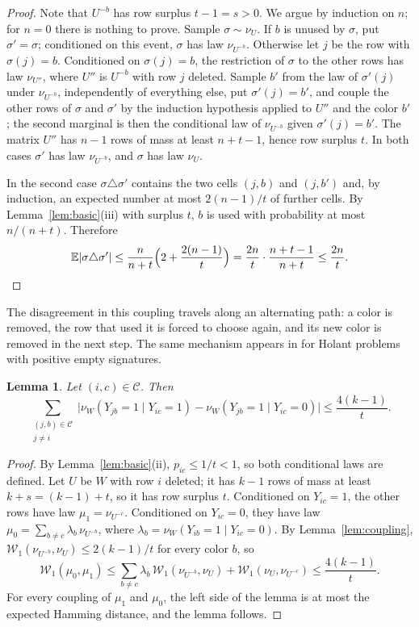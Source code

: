 \documentclass{amsart}
\numberwithin{equation}{section}
\theoremstyle{plain}
\newtheorem{lemma}[theorem]{Lemma}
\theoremstyle{definition}
\theoremstyle{remark}
\newcommand{\E}{\mathbb{E}}
\newcommand{\cC}{\mathcal{C}}
\begin{document}
\begin{proof}
Note that $U^{-b}$ has row surplus $t-1=s>0$. We argue by induction on $n$; for $n=0$ there is nothing to prove. Sample $\sigma\sim\nu_U$. If $b$ is unused by $\sigma$, put $\sigma'=\sigma$; conditioned on this event, $\sigma$ has law $\nu_{U^{-b}}$. Otherwise let $j$ be the row with $\sigma(j)=b$. Conditioned on $\sigma(j)=b$, the restriction of $\sigma$ to the other rows has law $\nu_{U''}$, where $U''$ is $U^{-b}$ with row $j$ deleted. Sample $b'$ from the law of $\sigma'(j)$ under $\nu_{U^{-b}}$, independently of everything else, put $\sigma'(j)=b'$, and couple the other rows of $\sigma$ and $\sigma'$ by the induction hypothesis applied to $U''$ and the color $b'$; the second marginal is then the conditional law of $\nu_{U^{-b}}$ given $\sigma'(j)=b'$. The matrix $U''$ has $n-1$ rows of mass at least $n+t-1$, hence row surplus $t$. In both cases $\sigma'$ has law $\nu_{U^{-b}}$, and $\sigma$ has law $\nu_U$.

In the second case $\sigma\triangle\sigma'$ contains the two cells $(j,b)$ and $(j,b')$ and, by induction, an expected number at most $2(n-1)/t$ of further cells. By Lemma~\ref{lem:basic}(iii) with surplus $t$, $b$ is used with probability at most $n/(n+t)$. Therefore
\[
\E|\sigma\triangle\sigma'|\le\frac{n}{n+t}\Bigl(2+\frac{2(n-1)}{t}\Bigr)=\frac{2n}{t}\cdot\frac{n+t-1}{n+t}\le\frac{2n}{t}.\qedhere
\]
\end{proof}

The disagreement in this coupling travels along an alternating path: a color is removed, the row that used it is forced to choose again, and its new color is removed in the next step. The same mechanism appears in \cite[Algorithm~1 and Proposition~17]{CG} for Holant problems with positive empty signatures.

\begin{lemma}\label{lem:influence}
Let $(i,c)\in\cC$. Then
\[
\sum_{\substack{(j,b)\in\cC\\ j\ne i}}\bigl|\nu_W(Y_{jb}=1\mid Y_{ic}=1)-\nu_W(Y_{jb}=1\mid Y_{ic}=0)\bigr|\le\frac{4(k-1)}{t}.
\]
\end{lemma}

\begin{proof}
By Lemma~\ref{lem:basic}(ii), $p_{ic}\le1/t<1$, so both conditional laws are defined. Let $U$ be $W$ with row $i$ deleted; it has $k-1$ rows of mass at least $k+s=(k-1)+t$, so it has row surplus $t$. Conditioned on $Y_{ic}=1$, the other rows have law $\mu_1=\nu_{U^{-c}}$. Conditioned on $Y_{ic}=0$, they have law $\mu_0=\sum_{b\ne c}\lambda_b\,\nu_{U^{-b}}$, where $\lambda_b=\nu_W(Y_{ib}=1\mid Y_{ic}=0)$. By Lemma~\ref{lem:coupling}, $\mathcal W_1(\nu_{U^{-b}},\nu_U)\le2(k-1)/t$ for every color $b$, so
\[
\mathcal W_1(\mu_0,\mu_1)\le\sum_{b\ne c}\lambda_b\,\mathcal W_1(\nu_{U^{-b}},\nu_U)+\mathcal W_1(\nu_U,\nu_{U^{-c}})\le\frac{4(k-1)}{t}.
\]
For every coupling of $\mu_1$ and $\mu_0$, the left side of the lemma is at most the expected Hamming distance, and the lemma follows.
\end{proof}
\end{document}
